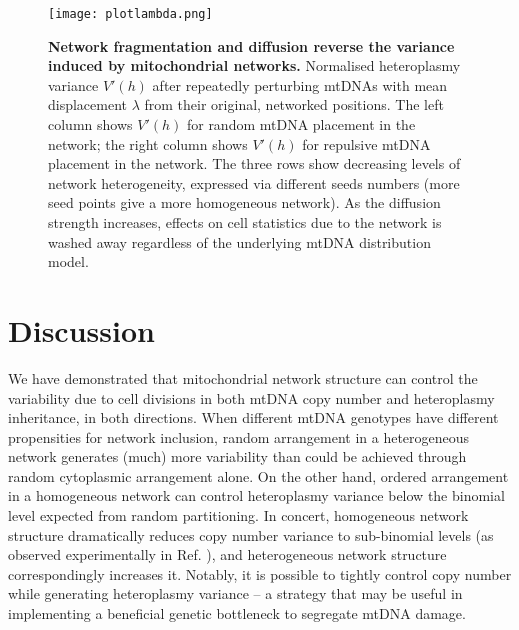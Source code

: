 \documentclass{article}
\begin{document}
\begin{figure}
\centering
\texttt{[image: plotlambda.png]}
\caption{\textbf{Network fragmentation and diffusion reverse the variance induced by mitochondrial networks.} Normalised heteroplasmy variance $V'(h)$ after repeatedly perturbing mtDNAs with mean displacement $\lambda$ from their original, networked positions. The left column shows $V'(h)$ for random mtDNA placement in the network; the right column shows $V'(h)$ for repulsive mtDNA placement in the network. The three rows show decreasing levels of network heterogeneity, expressed via different seeds numbers (more seed points give a more homogeneous network). As the diffusion strength increases, effects on cell statistics due to the network is washed away regardless of the underlying mtDNA distribution model.}\label{fig:diffusion}
\end{figure}

\section{Discussion}

We have demonstrated that mitochondrial network structure can control the variability due to cell divisions in both mtDNA copy number and heteroplasmy inheritance, in both directions. When different mtDNA genotypes have different propensities for network inclusion, random arrangement in a heterogeneous network generates (much) more variability than could be achieved through random cytoplasmic arrangement alone. On the other hand, ordered arrangement in a homogeneous network can control heteroplasmy variance below the binomial level expected from random partitioning. In concert, homogeneous network structure dramatically reduces copy number variance to sub-binomial levels (as observed experimentally in Ref. \citep{jajoo2016accurate}), and heterogeneous network structure correspondingly increases it. Notably, it is possible to tightly control copy number while generating heteroplasmy variance -- a strategy that may be useful in implementing a beneficial genetic bottleneck to segregate mtDNA damage.
\end{document}

